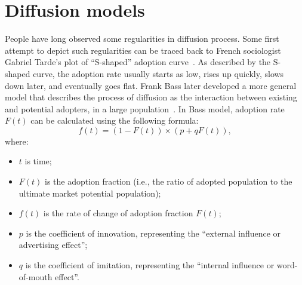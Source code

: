 \documentclass[phd,tocprelim]{cornell}
\begin{document}





\section{Diffusion models}

People have long observed some regularities in diffusion process. Some first attempt to depict such regularities can be traced back to French sociologist Gabriel Tarde's plot of ``S-shaped'' adoption curve~\cite{Tarde-1903}. As described by the S-shaped curve, the adoption rate usually starts as low, rises up quickly, slows down later, and eventually goes flat. Frank Bass later developed a more general model that describes the process of diffusion as the interaction between existing and potential adopters, in a large population~\cite{Bass:1969}. In Bass model, adoption rate $F(t)$ can be calculated using the following formula:
\begin{equation}
f(t) = (1 - F(t))\times(p + qF(t)),
\end{equation}
\noindent
where:
\vspace{-8pt}
\begin{itemize}
\item $t$ is time;
\item $F(t)$ is the adoption fraction (i.e., the ratio of adopted population to the ultimate market potential population);
\item $f(t)$ is the rate of change of adoption fraction $F(t)$;
\item $p$ is the coefficient of innovation, representing the ``external influence or advertising effect'';
\item $q$ is the coefficient of imitation, representing the ``internal influence or word-of-mouth effect''.
\end{itemize}
\end{document}
